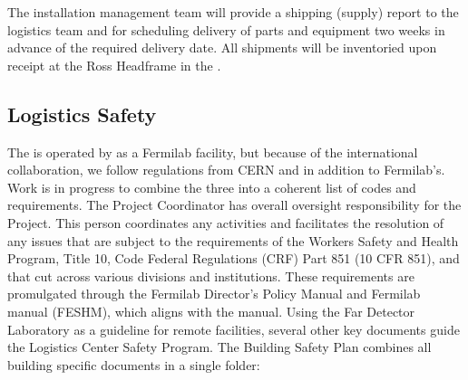  
The  installation management team will provide a shipping (supply) report to the  logistics team and  for scheduling delivery of parts and equipment two weeks in advance of the required delivery date. 
All shipments will be inventoried upon receipt at the Ross Headframe in the . 




\subsection{Logistics Safety}
\label{sec:fdsp-tc-log-safety}


The   is operated by   as a Fermilab facility, but because of the international collaboration, we  follow  regulations from CERN and  in addition to Fermilab's.  Work is in progress to combine the three into a coherent list of codes and requirements. The  Project  Coordinator has overall  oversight responsibility for the  Project.  This person coordinates any  activities and facilitates the resolution of any issues that are subject to the requirements of the  Workers Safety and Health Program, Title 10, Code Federal Regulations (CRF) Part 851 (10 CFR 851), and that cut across various divisions  and institutions. These requirements are promulgated through the Fermilab Director's Policy Manual  and Fermilab  manual (FESHM\cite{feshm}), which aligns with the   manual.  Using the  Far Detector Laboratory as a guideline for remote facilities, several other key documents guide the Logistics Center Safety Program.  The Building Safety Plan  combines all building specific documents in a single folder:

